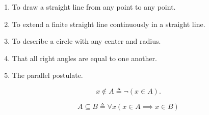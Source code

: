 \begin{frame}{}

  \begin{enumerate}[(1)]
    \item To draw a straight line from any point to any point.
    \item To extend a finite straight line continuously in a straight line.
    \item To describe a circle with any center and radius.
    \item That all right angles are equal to one another.
    \item The parallel postulate.
  \end{enumerate}
\end{frame}

\begin{frame}{}
  \begin{definition}[$\notin$]
    \[
      x \notin A \triangleq \lnot (x \in A).
    \]
  \end{definition}

  \pause
  \vspace{0.50cm}
  \begin{definition}[$\subseteq$]
    \[
      A \subseteq B \triangleq \forall x (x \in A \implies x \in B)
    \]
  \end{definition}
\end{frame}


